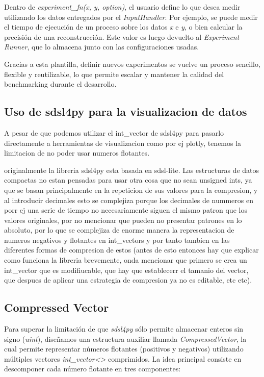 Dentro de \textit{experiment\_fn(x, y, option)}, el usuario define lo que desea medir utilizando los datos entregados por el \textit{InputHandler}. Por ejemplo, se puede medir el tiempo de ejecución de un proceso sobre los datos \textit{x} e \textit{y}, o bien calcular la precisión de una reconstrucción. Este valor es luego devuelto al \textit{Experiment Runner}, que lo almacena junto con las configuraciones usadas.

Gracias a esta plantilla, definir nuevos experimentos se vuelve un proceso sencillo, flexible y reutilizable, lo que permite escalar y mantener la calidad del benchmarking durante el desarrollo.


\subsection{Uso de sdsl4py para la visualizacion de datos}

A pesar de que podemos utilizar el int\_vector de sdsl4py para pasarlo directamente a herramientas de visualizacion como por ej plotly, tenemos la limitacion de no poder usar numeros flotantes.

originalmente la libreria sdsl4py esta basada en sdsl-lite. Las estructuras de datos compactas no estan pensadas para usar otra cosa que no sean unsigned ints, ya que se basan principalmente en la repeticion de sus valores para la compresion, y al introducir decimales esto se complejiza porque los decimales de nummeros en  porr ej una serie de tiempo no necesariamente siguen el mismo patron que los valores originales, por no mencionar que pueden no presentar patrones en lo absoluto, por lo que se complejiza de enorme manera la representacion de numeros negativos y flotantes en int\_vectors y por tanto tambien en las diferentes formas de compresion de estos (antes de esto entonces hay que explicar como funciona la libreria brevemente, onda mencionar que primero se crea un int\_vector que es modifiucable, que hay que establecerr el tamanio del vector, que despues de aplicar una estrategia de compresion ya no es editable, etc etc).

\subsection{Compressed Vector}

Para superar la limitación de que \textit{sdsl4py} sólo permite almacenar enteros sin signo (\textit{uint}), diseñamos una estructura auxiliar llamada \textit{CompressedVector}, la cual permite representar números flotantes (positivos y negativos) utilizando múltiples vectores \textit{int\_vector<>} comprimidos. La idea principal consiste en descomponer cada número flotante en tres componentes:

